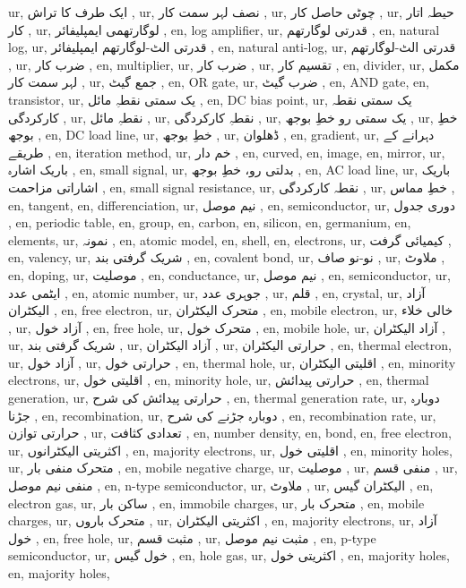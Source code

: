 ur, ایک طرف کا تراش ,
ur, نصف لہر سمت کار ,
ur, چوٹی حاصل کار ,
ur, حیطہ اتار کار ,
ur, لوگارتھمی ایمپلیفائر ,
en, log amplifier,
ur, قدرتی لوگارتھم ,
en, natural log,
ur, قدرتی الٹ-لوگارتھم ایمپلیفائر ,
en, natural anti-log,
ur, قدرتی الٹ-لوگارتھم ,
ur, ضرب کار ,
en, multiplier,
ur, ضرب کار ,
ur, تقسیم کار ,
en, divider,
ur, مکمل لہر سمت کار ,
ur, جمع گیٹ ,
en, OR gate,
ur, ضرب گیٹ ,
en, AND gate,
en, transistor,
ur, یک سمتی نقطہِ مائل ,
en, DC bias point,
ur, یک سمتی نقطہ کارکردگی ,
ur, نقطہِ مائل ,
ur, نقطہِ کارکردگی ,
ur, یک سمتی رو خطِ بوجھ ,
ur, خطِ بوجھ ,
en, DC load line,
ur, خطِ بوجھ ,
ur, ڈھلوان ,
en, gradient,
ur, دہرانے کے طریقے ,
en, iteration method,
ur, خم دار ,
en, curved,
en, image,
en, mirror,
ur, باریک اشارہ ,
en, small signal,
ur, بدلتی رو، خطِ بوجھ ,
en, AC load line,
ur, باریک اشاراتی مزاحمت ,
en, small signal resistance,
ur, نقطہ کارکردگی ,
ur, خطِ مماس ,
en, tangent,
en, differenciation,
ur, نیم موصل ,
en, semiconductor,
ur, دوری جدول ,
en, periodic table,
en, group,
en, carbon,
en, silicon,
en, germanium,
en, elements,
ur, نمونہ ,
en, atomic model,
en, shell,
en, electrons,
ur, کیمیائی گرفت ,
en, valency,
ur, شریک گرفتی بند ,
en, covalent bond,
ur, نو-نو صاف ,
ur, ملاوٹ ,
en, doping,
ur, موصلیت ,
en, conductance,
ur, نیم موصل ,
en, semiconductor,
ur, ایٹمی عدد ,
en, atomic number,
ur, جوہری عدد ,
ur, قلم ,
en, crystal,
ur, آزاد الیکٹران ,
en, free electron,
ur, متحرک الیکٹران ,
en, mobile electron,
ur, خالی خلاء ,
ur, آزاد خول ,
en, free hole,
ur, متحرک خول ,
en, mobile hole,
ur, آزاد الیکٹران ,
ur, شریک گرفتی بند ,
ur, آزاد الیکٹران ,
ur, حرارتی الیکٹران ,
en, thermal electron,
ur, آزاد خول ,
ur, حرارتی خول ,
en, thermal hole,
ur, اقلیتی الیکٹران ,
en, minority electrons,
ur, اقلیتی خول ,
en, minority hole,
ur, حرارتی پیدائش ,
en, thermal generation,
ur, حرارتی پیدائش کی شرح ,
en, thermal generation rate,
ur, دوبارہ جڑنا ,
en, recombination,
ur, دوبارہ جڑنے کی شرح ,
en, recombination rate,
ur, حرارتی توازن ,
ur, تعدادی کثافت ,
en, number density,
en, bond,
en, free electron,
ur, اکثریتی الیکٹرانوں ,
en, majority electrons,
ur, اقلیتی خول ,
en, minority holes,
ur, متحرک منفی بار ,
en, mobile negative charge,
ur, موصلیت ,
ur, منفی قسم ,
ur, منفی نیم موصل ,
en, n-type semiconductor,
ur, ملاوٹ ,
ur, الیکٹران گیس ,
en, electron gas,
ur, ساکن بار ,
en, immobile charges,
ur, متحرک بار ,
en, mobile charges,
ur, متحرک باروں ,
ur, اکثریتی الیکٹران ,
en, majority electrons,
ur, آزاد خول ,
en, free hole,
ur, مثبت قسم ,
ur, مثبت نیم موصل ,
en, p-type semiconductor,
ur, خول گیس ,
en, hole gas,
ur, اکثریتی خول ,
en, majority holes,
en, majority holes,
